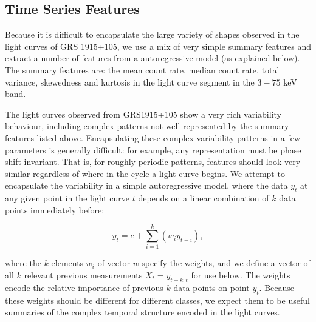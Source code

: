 \documentclass[fleqn,usenatbib]{mnras}
\begin{document}
\subsection{Time Series Features}

Because it is difficult to encapsulate the large variety of shapes observed in the light curves of GRS 1915+105, we use a mix of very simple summary features and extract a number of features from a autoregressive model (as explained below). The summary features are: the mean count rate, median count rate, total variance, skewedness and kurtosis in the light curve segment in the $3 - 75$ keV band. 

The light curves observed from GRS1915+105 show a very rich variability behaviour, including complex patterns not well represented by the summary features listed above. Encapsulating these complex variability patterns in a few parameters is generally difficult: for example, any representation must be phase shift-invariant. That is, for roughly periodic patterns, features should look very similar regardless of where in the cycle a light curve begins. We attempt to encapsulate the variability in a simple autoregressive model, where the data $y_t$ at any given point in the light curve $t$ depends on a linear combination of $k$ data points immediately before:

\begin{equation}
y_{t} = c + \sum_{i=1}^k{\left( w_i y_{t-i}\right)} ,
\end{equation}

\noindent  where the $k$ elements $w_i$ of vector $w$ specify the weights, and we define a vector of all $k$ relevant previous measurements $X_t = y_{t-k:t}$ for use below. The weights encode the relative importance of previous $k$ data points on point $y_{t}$. Because these weights should be different for different classes, we expect them to be useful summaries of the complex temporal structure encoded in the light curves.
\end{document}
